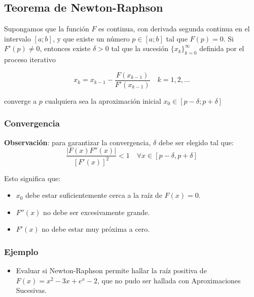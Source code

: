 \documentclass[openany]{book}
\providecommand{\tightlist}{%
  \setlength{\itemsep}{0pt}\setlength{\parskip}{0pt}}
\begin{document}
\hypertarget{teorema-de-newton-raphson}{%
\subsection{Teorema de Newton-Raphson}\label{teorema-de-newton-raphson}}

Supongamos que la función \(F\) es continua, con derivada segunda continua en el intervalo \([a; b]\), y que existe un número \(p \in [a; b]\) tal que \(F(p) = 0\). Si \(F'(p) \neq 0\), entonces existe \(\delta > 0\) tal que la sucesión \(\{x_k\}_{k=0}^{\infty}\) definida por el proceso iterativo

\[
x_k = x_{k-1} - \frac{F(x_{k-1})}{F'(x_{k-1})} \quad k = 1, 2, \dots
\]

converge a \(p\) cualquiera sea la aproximación inicial \(x_0 \in [p - \delta; p + \delta]\)

\hypertarget{convergencia}{%
\subsubsection*{Convergencia}\label{convergencia}}

\textbf{Observación}: para garantizar la convergencia, \(\delta\) debe ser elegido tal que:
\[\frac{|F(x)F''(x)|}{[F'(x)]^2} < 1  \quad \forall x \in [p - \delta, p + \delta]\]

Esto significa que:

\begin{itemize}
\tightlist
\item
  \(x_0\) debe estar suficientemente cerca a la raíz de \(F(x) = 0\).
\item
  \(F''(x)\) no debe ser excesivamente grande.
\item
  \(F'(x)\) no debe estar muy próxima a cero.
\end{itemize}

\hypertarget{ejemplo-6}{%
\subsubsection*{Ejemplo}\label{ejemplo-6}}

\begin{itemize}
\tightlist
\item
  Evaluar si Newton-Raphson permite hallar la raíz positiva de \(F(x) = x^2-3x+e^x-2\), que no pudo ser hallada con Aproximaciones Sucesivas.
\end{itemize}
\end{document}
